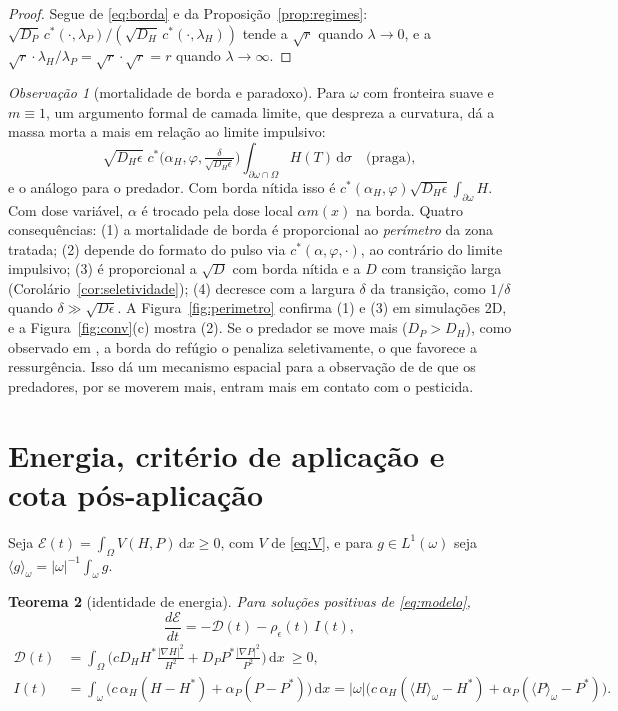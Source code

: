 \documentclass[11pt,a4paper]{article}
\numberwithin{equation}{section}
\newtheorem{teorema}{Teorema}[section]
\theoremstyle{definition}
\theoremstyle{remark}
\newtheorem{observacao}[teorema]{Observação}
\newcommand{\E}{\mathcal{E}}
\newcommand{\dd}{\,\mathrm{d}}
\newcommand{\Hs}{H^{*}}
\newcommand{\Ps}{P^{*}}
\newcommand{\med}[1]{\langle #1\rangle_\omega}
\begin{document}
\begin{proof}
Segue de \eqref{eq:borda} e da Proposição~\ref{prop:regimes}: $\sqrt{D_P}\,c^*(\cdot,\lambda_P)/(\sqrt{D_H}\,c^*(\cdot,\lambda_H))$
tende a $\sqrt r$ quando $\lambda\to0$, e a $\sqrt r\cdot\lambda_H/\lambda_P=\sqrt r\cdot\sqrt r=r$ quando
$\lambda\to\infty$.
\end{proof}

\begin{observacao}[mortalidade de borda e paradoxo]\label{obs:borda}
Para $\omega$ com fronteira suave e $m\equiv1$, um argumento formal de camada limite, que despreza a
curvatura, dá a massa morta a mais em relação ao limite impulsivo:
\[
\sqrt{D_H\epsilon}\;c^*\Big(\alpha_H,\varphi,\tfrac{\delta}{\sqrt{D_H\epsilon}}\Big)\int_{\partial\omega\cap\Omega}H(T)\dd\sigma
\quad\text{(praga)},
\]
e o análogo para o predador. Com borda nítida isso é $c^*(\alpha_H,\varphi)\sqrt{D_H\epsilon}\int_{\partial\omega}H$.
Com dose variável, $\alpha$ é trocado pela dose local $\alpha m(x)$ na borda.
Quatro consequências: (1) a mortalidade de borda é proporcional ao \emph{perímetro} da zona tratada;
(2) depende do formato do pulso via $c^*(\alpha,\varphi,\cdot)$, ao contrário do limite impulsivo;
(3) é proporcional a $\sqrt D$ com borda nítida e a $D$ com transição larga
(Corolário~\ref{cor:seletividade}); (4) decresce com a largura $\delta$ da transição, como $1/\delta$
quando $\delta\gg\sqrt{D\epsilon}$. A Figura~\ref{fig:perimetro} confirma (1) e (3) em simulações 2D, e a Figura~\ref{fig:conv}(c) mostra (2). Se o predador se move mais ($D_P>D_H$), como observado em
\cite{Heong}, a borda do refúgio o penaliza seletivamente, o que favorece a ressurgência.
Isso dá um mecanismo espacial para a observação de \cite{Heong} de que os predadores, por se
moverem mais, entram mais em contato com o pesticida.
\end{observacao}

\section{Energia, critério de aplicação e cota pós-aplicação}

Seja $\E(t)=\int_\Omega V(H,P)\dd x\ge0$, com $V$ de \eqref{eq:V}, e para $g\in L^1(\omega)$ seja
$\med g=|\omega|^{-1}\int_\omega g$.

\begin{teorema}[identidade de energia]\label{teo:energia}
Para soluções positivas de \eqref{eq:modelo},
\begin{equation}\label{eq:identidade}
\frac{d\E}{dt}=-\mathcal D(t)-\rho_\epsilon(t)\,I(t),
\end{equation}
\begin{align*}
\mathcal D(t)&=\int_\Omega\Big(cD_H\Hs\frac{|\nabla H|^2}{H^2}+D_P\Ps\frac{|\nabla P|^2}{P^2}\Big)\dd x\ \ge0,\\
I(t)&=\int_\omega\big(c\,\alpha_H(H-\Hs)+\alpha_P(P-\Ps)\big)\dd x
=|\omega|\big(c\,\alpha_H(\med H-\Hs)+\alpha_P(\med P-\Ps)\big).
\end{align*}
\end{teorema}
\end{document}
